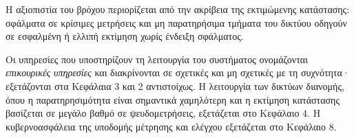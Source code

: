 Η αξιοπιστία του βρόχου περιορίζεται από την ακρίβεια της εκτιμώμενης κατάστασης: σφάλματα
σε κρίσιμες μετρήσεις και μη παρατηρήσιμα τμήματα του δικτύου οδηγούν σε εσφαλμένη ή ελλιπή
εκτίμηση χωρίς ένδειξη σφάλματος.

Οι υπηρεσίες που υποστηρίζουν τη λειτουργία του συστήματος ονομάζονται \emph{επικουρικές
υπηρεσίες} και διακρίνονται σε σχετικές και μη σχετικές με τη συχνότητα· εξετάζονται στα
Κεφάλαια 3 και 2 αντιστοίχως. Η λειτουργία των δικτύων διανομής, όπου η παρατηρησιμότητα
είναι σημαντικά χαμηλότερη και η εκτίμηση κατάστασης βασίζεται σε μεγάλο βαθμό σε
ψευδομετρήσεις, εξετάζεται στο Κεφάλαιο 4. Η κυβερνοασφάλεια της υποδομής μέτρησης και
ελέγχου εξετάζεται στο Κεφάλαιο 8.
